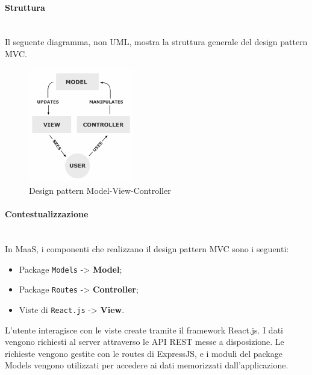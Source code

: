 \paragraph{Struttura} \mbox{} \\
Il seguente diagramma, non UML, mostra la struttura generale del design pattern MVC.
\begin{figure}[H]
\centering
\includegraphics[height=5cm]{res/sections/backend/mvc.png}
\caption{Design pattern Model-View-Controller}
\end{figure}
\paragraph{Contestualizzazione} \mbox{} \\
In MaaS, i componenti che realizzano il design pattern MVC sono i seguenti:
\begin{itemize}
\item Package \texttt{Models} -> \textbf{Model};
\item Package \texttt{Routes} -> \textbf{Controller};
\item Viste di \texttt{React.js} -> \textbf{View}.
\end{itemize}
L'utente interagisce con le viste create tramite il framework React.js. I dati vengono richiesti al server attraverso le API REST messe a disposizione. Le richieste vengono gestite con le routes di ExpressJS, e i moduli del package Models vengono utilizzati per accedere ai dati memorizzati dall'applicazione.
